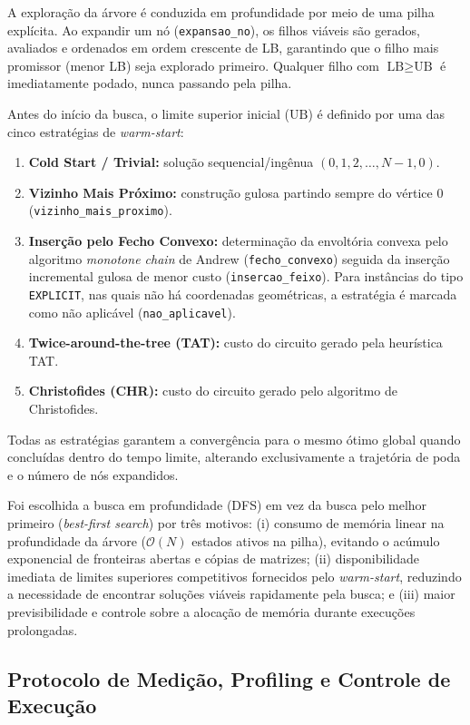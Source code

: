 \documentclass[12pt]{article}
\begin{document}
A exploração da árvore é conduzida em profundidade por meio de uma pilha explícita. Ao expandir um nó (\texttt{expansao\_no}), os filhos viáveis são gerados, avaliados e ordenados em ordem crescente de LB, garantindo que o filho mais promissor (menor LB) seja explorado primeiro. Qualquer filho com $\text{LB} \ge \text{UB}$ é imediatamente podado, nunca passando pela pilha.

Antes do início da busca, o limite superior inicial ($\text{UB}$) é definido por uma das cinco estratégias de \textit{warm-start}:
\begin{enumerate}
    \item \textbf{Cold Start / Trivial:} solução sequencial/ingênua $(0, 1, 2, \dots, N-1, 0)$.
    \item \textbf{Vizinho Mais Próximo:} construção gulosa partindo sempre do vértice $0$ (\texttt{vizinho\_mais\_proximo}).
    \item \textbf{Inserção pelo Fecho Convexo:} determinação da envoltória convexa pelo algoritmo \textit{monotone chain} de Andrew (\texttt{fecho\_convexo}) seguida da inserção incremental gulosa de menor custo (\texttt{insercao\_feixo}). Para instâncias do tipo \texttt{EXPLICIT}, nas quais não há coordenadas geométricas, a estratégia é marcada como não aplicável (\texttt{nao\_aplicavel}).
    \item \textbf{Twice-around-the-tree (TAT):} custo do circuito gerado pela heurística TAT.
    \item \textbf{Christofides (CHR):} custo do circuito gerado pelo algoritmo de Christofides.
\end{enumerate}
Todas as estratégias garantem a convergência para o mesmo ótimo global quando concluídas dentro do tempo limite, alterando exclusivamente a trajetória de poda e o número de nós expandidos.

Foi escolhida a busca em profundidade (DFS) em vez da busca pelo melhor primeiro (\textit{best-first search}) por três motivos: (i) consumo de memória linear na profundidade da árvore ($\mathcal{O}(N)$ estados ativos na pilha), evitando o acúmulo exponencial de fronteiras abertas e cópias de matrizes; (ii) disponibilidade imediata de limites superiores competitivos fornecidos pelo \textit{warm-start}, reduzindo a necessidade de encontrar soluções viáveis rapidamente pela busca; e (iii) maior previsibilidade e controle sobre a alocação de memória durante execuções prolongadas.

\subsection{Protocolo de Medição, Profiling e Controle de Execução}
\end{document}
